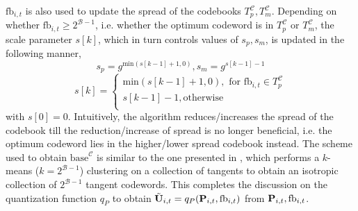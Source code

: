 \documentclass[conference]{IEEEtran}
\begin{document}
$\text{fb}_{i,t}$ is also used to update the spread of the codebooks $T^{\mathcal{C}}_p,T^{\mathcal{C}}_m$.
Depending on whether $\text{fb}_{i,t} \geq 2^{\mathcal{B}-1}$,
i.e. whether the optimum codeword is in $T^{\mathcal{C}}_p$ or
$T^{\mathcal{C}}_m$, the scale parameter $s[k]$, which in turn
controls values of $s_p, s_m$, is updated in the following manner,
$$s_p=g^{\text{min}(s[k-1]+1,0)}, s_m = g^{s[k-1]-1}$$
$$
s[k]=
\begin{cases}
\text{min}(s[k-1]+1,0), \text{ for } \text{fb}_{i,t} \in T^{\mathcal{C}}_p\\
s[k-1]-1, \text{otherwise}\\
\end{cases}
$$
with $s[0]=0$.
Intuitively, the algorithm reduces/increases the spread of the codebook till the reduction/increase of spread is no longer beneficial, i.e. the optimum codeword lies in the higher/lower spread codebook instead.
The scheme used to obtain $\text{base}^{\mathcal{C}}$ is similar to the one presented in \cite{Gupt1905:Predictive}, which performs a $k$-means ($k=2^{\mathcal{B}-1}$) clustering on a collection of tangents to obtain an isotropic collection of $2^{\mathcal{B}-1}$ tangent codewords.
This completes the discussion on the quantization function $q_P$ to obtain $\tilde{{\bf U}}_{i,t}=q_P({\bf P}_{i,t},\text{fb}_{i,t})$ from ${\bf P}_{i,t},\text{fb}_{i,t}$.
\end{document}
